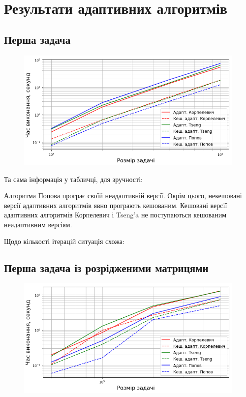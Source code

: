 \chapter{Результати адаптивних алгоритмів}

\section{Перша задача}

\begin{figure}[H]
    \centering
    \includegraphics[width=.75\textwidth]{img/1/adapt/time.png}
\end{figure}

Та сама інформація у табличці, для зручності:



Алгоритма Попова програє своїй неадаптивній версії. Окрім цього, некешовані версії адаптивних алгоритмів явно програють кешованим. Кешовані версії адаптивних алгоритмів Корпелевич і Tseng'a не поступаються кешованим неадаптивним версіям. \medskip

Щодо кількості ітерацій ситуація схожа:



\section{Перша задача із розрідженими матрицями}

\begin{figure}[H]
    \centering
    \includegraphics[width=.75\textwidth]{img/1/sparse/adapt/time.png}
\end{figure}

